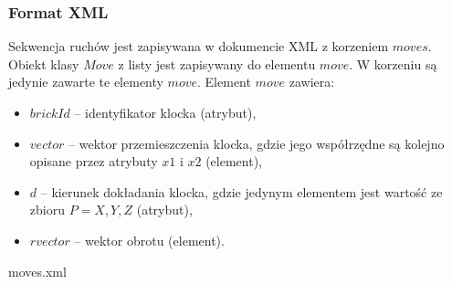 \documentclass[12pt]{article}
\begin{document}
\subsubsection{Format XML}
Sekwencja ruchów jest zapisywana w dokumencie XML z korzeniem $moves$.
Obiekt klasy $Move$ z listy jest zapisywany do elementu $move$. W korzeniu
są jedynie zawarte te elementy $move$. Element $move$ zawiera:
\begin{itemize}
	\item $brickId$ -- identyfikator klocka (atrybut),
	\item $vector$ -- wektor przemieszczenia klocka, gdzie jego współrzędne
		są kolejno opisane przez atrybuty $x1$ i $x2$ (element),
	\item $d$ -- kierunek dokładania klocka, gdzie jedynym elementem 
		jest wartość ze zbioru $P = {X,Y,Z}$ (atrybut),
	\item $rvector$ -- wektor obrotu (element).
\end{itemize}


{moves.xml}
\end{document}
